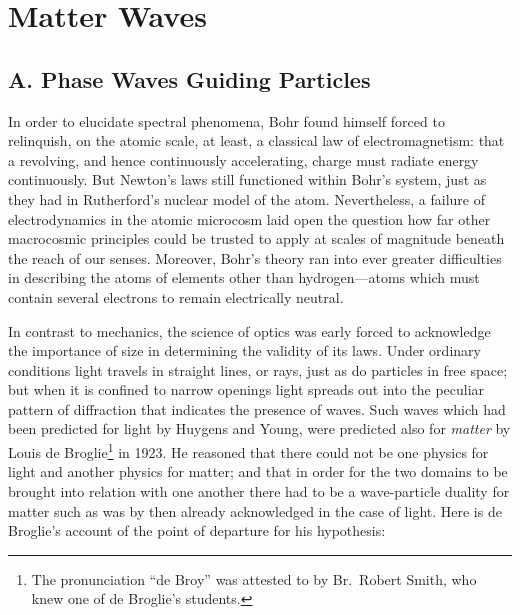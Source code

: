 \chapter{Matter Waves}\label{ChDeB}


\renewcommand{\theequation}{\arabic{equation}}

\section*{A. Phase Waves Guiding Particles}

In order to elucidate spectral phenomena, Bohr found himself forced to
relinquish, on the atomic scale, at least, a classical law of
electromagnetism: that a revolving, and hence continuously accelerating,
charge must radiate energy continuously. But Newton's laws still
functioned within Bohr's system, just as they had in Rutherford's
nuclear model of the atom. Nevertheless, a failure of electrodynamics in
the atomic microcosm laid open the question how far other macrocosmic
principles could be trusted to apply at scales of magnitude beneath the
reach of our senses. Moreover, Bohr's theory ran into ever greater
difficulties in describing the atoms of elements other than
hydrogen---atoms which must contain several electrons to remain
electrically neutral.

In contrast to mechanics, the science of optics was early forced to
acknowledge the importance of size in determining the validity of its
laws. Under ordinary conditions light travels in straight lines, or
rays, just as do particles in free space; but when it is confined to
narrow openings light spreads out into the peculiar pattern of
diffraction that indicates the presence of waves. Such waves which had
been predicted for light by Huygens and Young, were predicted also for
\emph{matter} by Louis de Broglie\footnote{The pronunciation ``de Broy''
  was attested to by Br.\ Robert Smith, who knew one of de Broglie's
  students.} in 1923. He reasoned that there could not be one physics
for light and another physics for matter; and that in order for the two
domains to be brought into relation with one another there had to be a
wave-particle duality for matter such as was by then already
acknowledged in the case of light. Here is de Broglie's account of the
point of departure for his hypothesis:


